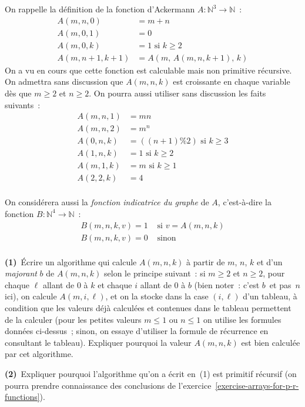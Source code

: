 \documentclass[12pt,a4paper]{article}
\theoremstyle{definition}
\begin{document}
On rappelle la définition de la fonction d'Ackermann $A\colon
\mathbb{N}^3 \to \mathbb{N}$ :
\[
\begin{aligned}
A(m,n,0) &= m+n \\
A(m,0,1) &= 0 \\
A(m,0,k) &= 1\text{~si~}k\geq 2 \\
A(m,n+1,k+1) &= A(m,\,A(m,n,k+1),\,k)
\end{aligned}
\]
On a vu en cours que cette fonction est calculable mais non primitive
récursive.  On admettra sans discussion que $A(m,n,k)$ est croissante
en chaque variable dès que $m\geq 2$ et $n\geq 2$.  On pourra aussi
utiliser sans discussion les faits suivants :
\[
\begin{aligned}
A(m,n,1) &= mn \\
A(m,n,2) &= m^n \\
A(0,n,k) &= ((n+1)\%2)\text{~si~}k\geq 3 \\
A(1,n,k) &= 1\text{~si~}k\geq 2 \\
A(m,1,k) &= m\text{~si~}k\geq 1 \\
A(2,2,k) &= 4 \\
\end{aligned}
\]

On considérera aussi la \emph{fonction indicatrice du graphe} de $A$,
c'est-à-dire la fonction $B\colon \mathbb{N}^4 \to \mathbb{N}$ :
\[
\begin{array}{ll}
B(m,n,k,v) = 1 &\text{~si~}v = A(m,n,k) \\
B(m,n,k,v) = 0 &\text{~sinon} \\
\end{array}
\]

\textbf{(1)} Écrire un algorithme qui calcule $A(m,n,k)$ à partir de
$m$, $n$, $k$ et d'un \emph{majorant} $b$ de $A(m,n,k)$ selon le
principe suivant : si $m\geq 2$ et $n\geq 2$, pour chaque $\ell$
allant de $0$ à $k$ et chaque $i$ allant de $0$ à $b$ (bien noter :
c'est $b$ et pas $n$ ici), on calcule $A(m,i,\ell)$, et on la stocke
dans la case $(i,\ell)$ d'un tableau, à condition que les valeurs déjà
calculées et contenues dans le tableau permettent de la calculer (pour
les petites valeurs $m\leq 1$ ou $n\leq 1$ on utilise les formules
données ci-dessus ; sinon, on essaye d'utiliser la formule de
récurrence en consultant le tableau).  Expliquer pourquoi la valeur
$A(m,n,k)$ est bien calculée par cet algorithme.

\textbf{(2)} Expliquer pourquoi l'algorithme qu'on a écrit en (1) est
primitif récursif (on pourra prendre connaissance des conclusions de
l'exercice \ref{exercise-arrays-for-p-r-functions}).
\end{document}
